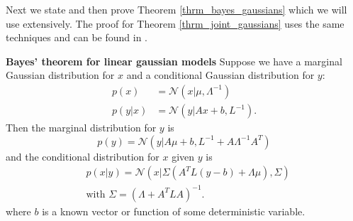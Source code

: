Next we state and then prove Theorem \ref{thrm_bayes_gaussians} which we will use extensively. The proof for Theorem \ref{thrm_joint_gaussians} uses the same techniques and can be found in \cite{bishop}.
\begin{thrm}
\textbf{Bayes' theorem for linear gaussian models}
Suppose we have a marginal Gaussian distribution for $x$ and a conditional Gaussian distribution for $y$:
\begin{equation}
\begin{aligned}
p(x) &= \mathcal{N}(x|\mu,\Lambda^{-1}) \\
p(y|x) &= \mathcal{N}(y|Ax + b, L^{-1}).
\end{aligned}
\label{eq_bayes_gauss_suppose}
\end{equation} 
Then the marginal distribution for $y$ is 
\begin{equation}
p(y) = \mathcal{N}(y|A\mu + b, L^{-1}+A\Lambda^{-1}A^T)
\label{eq_bayes_gauss1}
\end{equation}
and the conditional distribution for $x$ given $y$ is
\begin{equation}
\begin{aligned}
&p(x|y) = \mathcal{N}(x|\Sigma(A^TL(y-b)+\Lambda\mu), \Sigma) \\
&\text{with } \Sigma = (\Lambda + A^TLA)^{-1}.
\end{aligned}
\label{eq_bayes_gauss2}
\end{equation}
\label{thrm_bayes_gaussians}
where $b$ is a known vector or function of some deterministic variable. 
\label{thrm_bayes_lin_gauss_mod}
\end{thrm}
